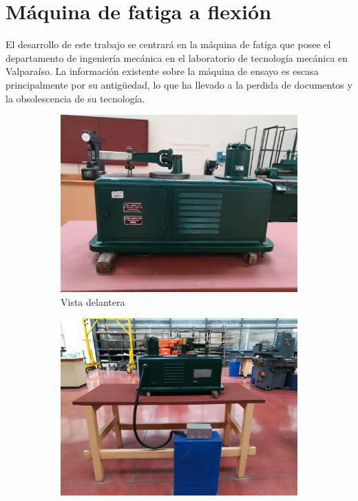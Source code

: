 \section{Máquina de fatiga a flexión}
El desarrollo de este trabajo se centrará en la máquina de fatiga que posee el departamento de ingeniería mecánica en el laboratorio de tecnología mecánica en Valparaíso. La información existente sobre la máquina de ensayo es escasa principalmente por su antigüedad, lo que ha llevado a la perdida de documentos y la obsolescencia de su tecnología.  

\begin{figure}[h]
\centering
	\begin{subfigure}{0.49\linewidth}
		\centering	
		\includegraphics[width=1\linewidth]{Imagenes/maq_del.jpg}
		\caption{Vista delantera}\label{fig:maq_del}
	\end{subfigure}
	\begin{subfigure}{0.49\linewidth}
		\centering		
		\includegraphics[width=1\linewidth]{Imagenes/maqfull_post.jpg}

\end{subfigure}
\end{figure}
